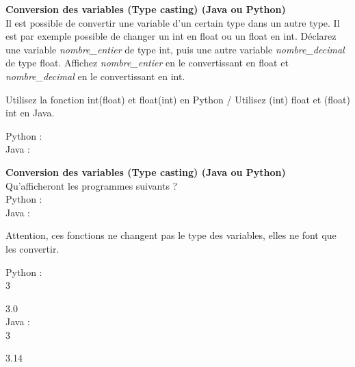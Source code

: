 \begin{Exercice}[3 minutes] \textbf{Conversion des variables (Type casting) (Java ou Python)}\\
   Il est possible de convertir une variable d'un certain type dans un autre type. Il est par exemple possible de changer un int en float ou un float en int. Déclarez une variable \textit{nombre\_entier} de type int, puis une autre variable \textit{nombre\_decimal} de type float. Affichez \textit{nombre\_entier} en le convertissant en float et \textit{nombre\_decimal} en le convertissant en int. \\
   
    \begin{conseil}
       Utilisez la fonction int(float) et float(int) en Python / Utilisez (int) float et (float) int en Java.
        
    \end{conseil}
    \begin{solution}
    
    Python : \\
    
    
    
    Java : \\
    
    
           
    \end{solution}   
\end{Exercice}

\begin{Exercice}[3 minutes] \textbf{Conversion des variables (Type casting) (Java ou Python)}\\
   Qu'afficheront les programmes suivants ? \\
   
   Python : \\
   
   
   
   Java : \\
   
   
    
   
    \begin{conseil}
      	Attention, ces fonctions ne changent pas le type des variables, elles ne font que les convertir.
        
    \end{conseil}
    \begin{solution}
     
    Python : \\
    
    3
    
    3.0 \\
    
    Java : \\
    
    3
    
    3.14 \\
           
    \end{solution}   
\end{Exercice}

